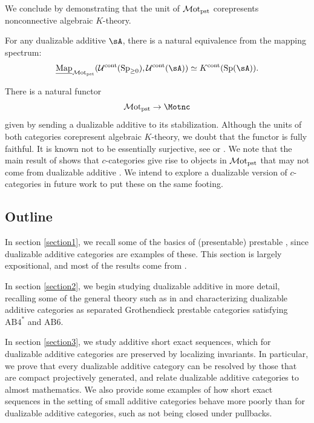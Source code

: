 \documentclass[a4paper,10pt, oneside]{amsart}
\begin{document}
We conclude by demonstrating that the unit of $\mathcal{M}\mathrm{ot}_{\mathrm{pst}}$ corepresents nonconnective algebraic $K$-theory.



\begin{thmX}
For any dualizable additive \infcat $\sA$, there is a natural equivalence from the mapping spectrum:
	\[
	\unmap_{\motpst}(\mcu^{\op{cont}}(\spgeq), \mcu^{\op{cont}}(\sA)) \simeq K^{\op{cont}}(\opsp(\sA)).
	\]
\end{thmX}

There is a natural functor $$\motpst \to \Motnc$$ given by sending a dualizable additive \infcat to its stabilization.
Although the units of both categories corepresent algebraic $K$-theory, we doubt that the functor is fully faithful. 
It is known not to be essentially surjective, see \cite[Theorem 7.11]{levy2025c} or \cite[Theorem 7.1]{efimov2025rigidity}. We note that the main result of \cite{levy2025c} shows that
$c$-categories give rise to objects in $\mathcal{M}\mathrm{ot}_{\mathrm{pst}}$ that may not come from dualizable additive \infcats. We intend to 
explore a dualizable version of $c$-categories in future work to put these on the same footing.






\subsection*{Outline}{}
In section \ref{section1}, we recall some of the basics of (presentable) prestable \infcats, since dualizable additive categories are examples of these. This section is largely expositional, and most of the results come from \cite{SAG}.

In section \ref{section2}, we begin studying dualizable additive \infcats in more detail, recalling some of the general theory such as in \cite{ramzi2024dualizable} and characterizing dualizable additive categories as separated Grothendieck prestable categories satisfying
$\mathrm{AB4}^*$ and $\mathrm{AB6}$.

In section \ref{section3}, we study additive short exact sequences, which for dualizable additive categories are preserved by localizing invariants. In particular, we prove that every dualizable additive category can be resolved by those that are compact projectively generated, 
and relate dualizable additive categories to almost mathematics. We also provide some examples of how short exact sequences in the setting of small additive categories behave more poorly than for dualizable additive categories, such as not being closed under pullbacks.
\end{document}

